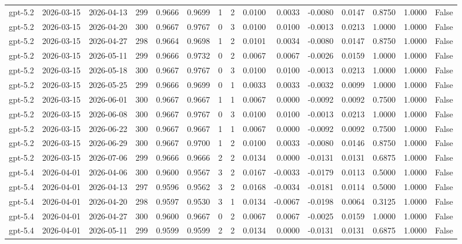 \begin{table}
\begin{tabular}{lllrrrrrrrrrrrr}
gpt-5.2 & 2026-03-15 & 2026-04-13 & 299 & 0.9666 & 0.9699 & 1 & 2 & 0.0100 & 0.0033 & -0.0080 & 0.0147 & 0.8750 & 1.0000 & False \\
gpt-5.2 & 2026-03-15 & 2026-04-20 & 300 & 0.9667 & 0.9767 & 0 & 3 & 0.0100 & 0.0100 & -0.0013 & 0.0213 & 1.0000 & 1.0000 & False \\
gpt-5.2 & 2026-03-15 & 2026-04-27 & 298 & 0.9664 & 0.9698 & 1 & 2 & 0.0101 & 0.0034 & -0.0080 & 0.0147 & 0.8750 & 1.0000 & False \\
gpt-5.2 & 2026-03-15 & 2026-05-11 & 299 & 0.9666 & 0.9732 & 0 & 2 & 0.0067 & 0.0067 & -0.0026 & 0.0159 & 1.0000 & 1.0000 & False \\
gpt-5.2 & 2026-03-15 & 2026-05-18 & 300 & 0.9667 & 0.9767 & 0 & 3 & 0.0100 & 0.0100 & -0.0013 & 0.0213 & 1.0000 & 1.0000 & False \\
gpt-5.2 & 2026-03-15 & 2026-05-25 & 299 & 0.9666 & 0.9699 & 0 & 1 & 0.0033 & 0.0033 & -0.0032 & 0.0099 & 1.0000 & 1.0000 & False \\
gpt-5.2 & 2026-03-15 & 2026-06-01 & 300 & 0.9667 & 0.9667 & 1 & 1 & 0.0067 & 0.0000 & -0.0092 & 0.0092 & 0.7500 & 1.0000 & False \\
gpt-5.2 & 2026-03-15 & 2026-06-08 & 300 & 0.9667 & 0.9767 & 0 & 3 & 0.0100 & 0.0100 & -0.0013 & 0.0213 & 1.0000 & 1.0000 & False \\
gpt-5.2 & 2026-03-15 & 2026-06-22 & 300 & 0.9667 & 0.9667 & 1 & 1 & 0.0067 & 0.0000 & -0.0092 & 0.0092 & 0.7500 & 1.0000 & False \\
gpt-5.2 & 2026-03-15 & 2026-06-29 & 300 & 0.9667 & 0.9700 & 1 & 2 & 0.0100 & 0.0033 & -0.0080 & 0.0146 & 0.8750 & 1.0000 & False \\
gpt-5.2 & 2026-03-15 & 2026-07-06 & 299 & 0.9666 & 0.9666 & 2 & 2 & 0.0134 & 0.0000 & -0.0131 & 0.0131 & 0.6875 & 1.0000 & False \\
gpt-5.4 & 2026-04-01 & 2026-04-06 & 300 & 0.9600 & 0.9567 & 3 & 2 & 0.0167 & -0.0033 & -0.0179 & 0.0113 & 0.5000 & 1.0000 & False \\
gpt-5.4 & 2026-04-01 & 2026-04-13 & 297 & 0.9596 & 0.9562 & 3 & 2 & 0.0168 & -0.0034 & -0.0181 & 0.0114 & 0.5000 & 1.0000 & False \\
gpt-5.4 & 2026-04-01 & 2026-04-20 & 298 & 0.9597 & 0.9530 & 3 & 1 & 0.0134 & -0.0067 & -0.0198 & 0.0064 & 0.3125 & 1.0000 & False \\
gpt-5.4 & 2026-04-01 & 2026-04-27 & 300 & 0.9600 & 0.9667 & 0 & 2 & 0.0067 & 0.0067 & -0.0025 & 0.0159 & 1.0000 & 1.0000 & False \\
gpt-5.4 & 2026-04-01 & 2026-05-11 & 299 & 0.9599 & 0.9599 & 2 & 2 & 0.0134 & 0.0000 & -0.0131 & 0.0131 & 0.6875 & 1.0000 & False \\

\end{tabular}
\end{table}
